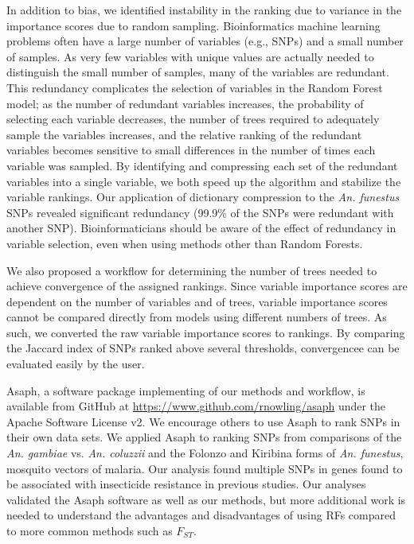 In addition to bias, we identified instability in the ranking due to variance in the importance scores due to random sampling.  Bioinformatics machine learning problems often have a large number of variables (e.g., SNPs) and a small number of samples.  As very few variables with unique values are actually needed to distinguish the small number of samples, many of the variables are redundant.  This redundancy complicates the selection of variables in the Random Forest model; as the number of redundant variables increases, the probability of selecting each variable decreases, the number of trees required to adequately sample the variables increases, and the relative ranking of the redundant variables becomes sensitive to small differences in the number of times each variable was sampled.  By identifying and compressing each set of the redundant variables into a single variable, we both speed up the algorithm and stabilize the variable rankings. Our application of dictionary compression to the \emph{An. funestus} SNPs revealed significant redundancy (99.9\% of the SNPs were redundant with another SNP).  Bioinformaticians should be aware of the effect of redundancy in variable selection, even when using methods other than Random Forests.

We also proposed a workflow for determining the number of trees needed to achieve convergence of the assigned rankings. Since variable importance scores are dependent on the number of variables and of trees, variable importance scores cannot be compared directly from models using different numbers of trees.  As such, we converted the raw variable importance scores to rankings. By comparing the Jaccard index of SNPs ranked above several thresholds, convergencee can be evaluated easily by the user.

Asaph, a software package implementing of our methods and workflow, is available from GitHub at \url{https://www.github.com/rnowling/asaph} under the Apache Software License v2.  We encourage others to use Asaph to rank SNPs in their own data sets.  We applied Asaph to ranking SNPs from comparisons of the \emph{An. gambiae} vs. \emph{An. coluzzii} and the Folonzo and Kiribina forms of \emph{An. funestus}, mosquito vectors of malaria.  Our analysis found multiple SNPs in genes found to be associated with insecticide resistance in previous studies.  Our analyses validated the Asaph software as well as our methods, but more additional work is needed to understand the advantages and disadvantages of using RFs compared to more common methods such as $F_{ST}$.


